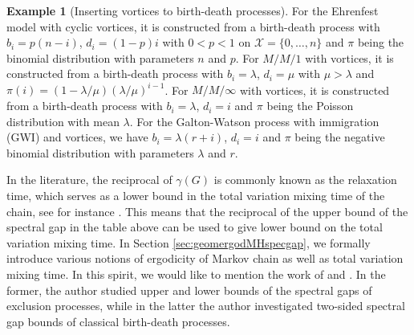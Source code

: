 \documentclass[12pt,a4]{amsart}
\numberwithin{equation}{section}
\theoremstyle{plain}
\theoremstyle{definition}
\newtheorem{example}{Example}[section]
\theoremstyle{remark}
\newcommand{\1}{\mathds{1}}
\begin{document}
\begin{example}[Inserting vortices to birth-death processes]
	For the Ehrenfest model with cyclic vortices, it is constructed from a birth-death process with $b_i = p(n-i)$, $d_i = (1-p)i$ with $0 < p < 1$ on $\mathcal{X} = \{0,\ldots,n\}$ and $\pi$ being the binomial distribution with parameters $n$ and $p$. For $M/M/1$ with vortices, it is constructed from a birth-death process with $b_i = \lambda$, $d_i = \mu$ with $\mu > \lambda$ and $\pi(i) = (1-\lambda/\mu)(\lambda/\mu)^{i-1}$. For $M/M/\infty$ with vortices, it is constructed from a birth-death process with $b_i = \lambda$, $d_i = i$ and $\pi$ being the Poisson distribution with mean $\lambda$. For the Galton-Watson process with immigration (GWI) and vortices, we have $b_i = \lambda(r+i)$, $d_i = i$ and $\pi$ being the negative binomial distribution with parameters $\lambda$ and $r$.
	
	In the literature, the reciprocal of $\gamma(G)$ is commonly known as the relaxation time, which serves as a lower bound in the total variation mixing time of the chain, see for instance \cite[Theorem $1$]{J13}. This means that the reciprocal of the upper bound of the spectral gap in the table above can be used to give lower bound on the total variation mixing time. In Section \ref{sec:geomergodMHspecgap}, we formally introduce various notions of ergodicity of Markov chain as well as total variation mixing time. In this spirit, we would like to mention the work of \cite[Section $4$]{Fill91} and \cite{Chen96}. In the former, the author studied upper and lower bounds of the spectral gaps of exclusion processes, while in the latter the author investigated two-sided spectral gap bounds of classical birth-death processes.
\end{example}
%
%
%
%
\end{document}
